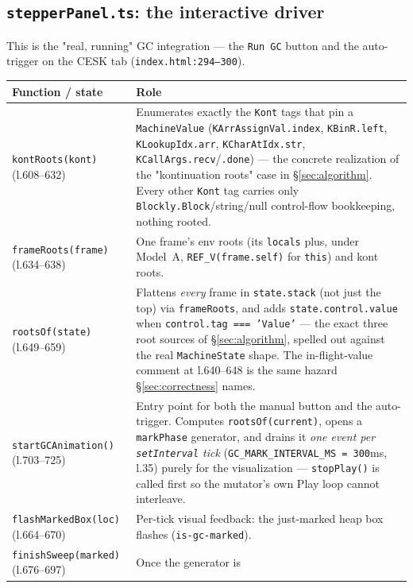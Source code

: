 \documentclass[11pt]{article}
\begin{document}
\subsection{\texttt{stepperPanel.ts}: the interactive driver}
\label{sec:ui}

This is the "real, running" GC integration --- the \texttt{Run GC}
button and the auto-trigger on the CESK tab (\texttt{index.html:294--300}).

\begin{center}
\begin{tabular}{@{}p{4.4cm}p{11.2cm}@{}}
\toprule
\textbf{Function / state} & \textbf{Role} \\
\midrule
\texttt{kontRoots(kont)} (l.608--632) & Enumerates exactly the \texttt{Kont}
  tags that pin a \texttt{MachineValue} (\texttt{KArrAssignVal.index},
  \texttt{KBinR.left}, \texttt{KLookupIdx.arr}, \texttt{KCharAtIdx.str},
  \texttt{KCallArgs.recv}/\texttt{.done}) --- the concrete realization of
  the "kontinuation roots" case in \S\ref{sec:algorithm}. Every other
  \texttt{Kont} tag carries only \texttt{Blockly.Block}/string/null
  control-flow bookkeeping, nothing rooted. \\
\texttt{frameRoots(frame)} (l.634--638) & One frame's env roots (its
  \texttt{locals} plus, under Model~A, \texttt{REF\_V(frame.self)} for
  \texttt{this}) and kont roots. \\
\texttt{rootsOf(state)} (l.649--659) & Flattens \emph{every} frame in
  \texttt{state.stack} (not just the top) via \texttt{frameRoots}, and adds
  \texttt{state.control.value} when \texttt{control.tag === 'Value'} ---
  the exact three root sources of \S\ref{sec:algorithm}, spelled out
  against the real \texttt{MachineState} shape. The in-flight-value comment
  at l.640--648 is the same hazard \S\ref{sec:correctness} names. \\
\texttt{startGCAnimation()} (l.703--725) & Entry point for both the manual
  button and the auto-trigger. Computes \texttt{rootsOf(current)}, opens a
  \texttt{markPhase} generator, and drains it \emph{one event per
  \texttt{setInterval} tick} (\texttt{GC\_MARK\_INTERVAL\_MS = 300}ms,
  l.35) purely for the visualization --- \texttt{stopPlay()} is called
  first so the mutator's own Play loop cannot interleave. \\
\texttt{flashMarkedBox(loc)} (l.664--670) & Per-tick visual feedback: the
  just-marked heap box flashes (\texttt{is-gc-marked}). \\
\texttt{finishSweep(marked)} (l.676--697) & Once the generator is

\end{tabular}
\end{center}
\end{document}
